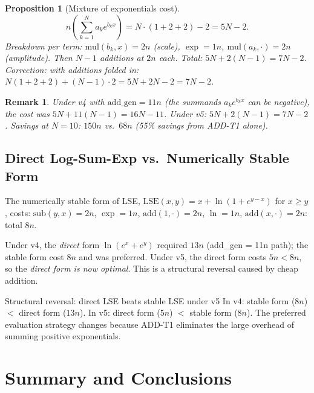 \documentclass[11pt,a4paper]{article}
\newtheorem{proposition}[theorem]{Proposition}
\newtheorem{remark}{Remark}[section]
\begin{document}
\begin{proposition}[Mixture of exponentials cost]
  \[
    n\!\left(\sum_{k=1}^N a_k e^{b_k x}\right) = N \cdot (1 + 2 + 2) - 2 = 5N - 2.
  \]
  Breakdown per term: $\mathrm{mul}(b_k, x) = 2n$ (scale), $\exp = 1n$,
  $\mathrm{mul}(a_k, \cdot) = 2n$ (amplitude). Then $N-1$ additions at $2n$ each.
  Total: $5N + 2(N-1) = 7N - 2$. \emph{Correction:} with additions folded in:
  $N(1+2+2) + (N-1) \cdot 2 = 5N + 2N - 2 = 7N - 2$.
\end{proposition}

\begin{remark}
  Under v4 with $\text{add\_gen} = 11n$ (the summands $a_k e^{b_k x}$ can be negative),
  the cost was $5N + 11(N-1) = 16N - 11$. Under v5: $5N + 2(N-1) = 7N - 2$.
  Savings at $N = 10$: $150n$ vs.\ $68n$ (55\% savings from ADD-T1 alone).
\end{remark}

\subsection{Direct Log-Sum-Exp vs.\ Numerically Stable Form}

The numerically stable form of LSE,
$\mathrm{LSE}(x, y) = x + \ln(1 + e^{y-x})$ for $x \geq y$, costs:
$\mathrm{sub}(y,x) = 2n$, $\exp = 1n$, $\mathrm{add}(1, \cdot) = 2n$,
$\ln = 1n$, $\mathrm{add}(x, \cdot) = 2n$: total $8n$.

Under v4, the \emph{direct} form $\ln(e^x + e^y)$ required $13n$ (add\_gen = 11n path);
the stable form cost $8n$ and was preferred. Under v5, the direct form costs $5n < 8n$,
so the \emph{direct form is now optimal}. This is a structural reversal caused by cheap addition.

\begin{findingbox}{Structural reversal: direct LSE beats stable LSE under v5}
  In v4: stable form ($8n$) $<$ direct form ($13n$). In v5: direct form ($5n$) $<$ stable
  form ($8n$). The preferred evaluation strategy changes because ADD-T1 eliminates the
  large overhead of summing positive exponentials.
\end{findingbox}

\section{Summary and Conclusions}
\end{document}

